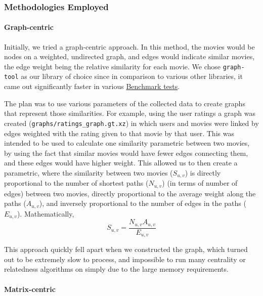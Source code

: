 \documentclass[11pt]{article}
\begin{document}
    \hypertarget{methodologies-employed}{%
\subsubsection{Methodologies Employed}\label{methodologies-employed}}

\hypertarget{graph-centric}{%
\paragraph{Graph-centric}\label{graph-centric}}

Initially, we tried a graph-centric approach. In this method, the movies
would be nodes on a weighted, undirected graph, and edges would indicate
similar movies, the edge weight being the relative similarity for each
movie. We chose \texttt{graph-tool} as our library of choice since in
comparison to various other libraries, it came out significantly faster
in various
\href{https://www.timlrx.com/2020/05/10/benchmark-of-popular-graph-network-packages-v2/}{Benchmark
tests}.

The plan was to use various parameters of the collected data to create
graphs that represent those similarities. For example, using the user
ratings a graph was created (\texttt{graphs/ratings\_graph.gt.xz}) in
which users and movies were linked by edges weighted with the rating
given to that movie by that user. This was intended to be used to
calculate one similarity parametric between two movies, by using the
fact that similar movies would have fewer edges connecting them, and
these edges would have higher weight. This allowed us to then create a
parametric, where the similarity between two movies (\(S_{u, v}\)) is
directly proportional to the number of shortest paths (\(N_{u, v}\)) (in
terms of number of edges) between two movies, directly proportional to
the average weight along the paths (\(A_{u, v}\)), and inversely
proportional to the number of edges in the paths (\(E_{u, v}\)).
Mathematically, \[S_{u,v} = \frac{N_{u, v}A_{u, v}}{E_{u, v}}\]

This approach quickly fell apart when we constructed the graph, which
turned out to be extremely slow to process, and impossible to run many
centrality or relatedness algorithms on simply due to the large memory
requirements.

\hypertarget{matrix-centric}{%
\paragraph{Matrix-centric}\label{matrix-centric}}
\end{document}
